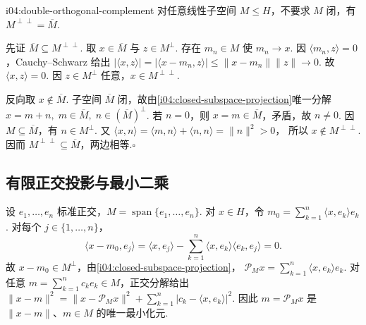 \begin{FAProposition}[B][双正交补定理]{i04:double-orthogonal-complement}
对任意线性子空间 \(\displaystyle M\leqslant H\)，不要求 \(\displaystyle M\) 闭，有 \(\displaystyle M^{\perp\perp}=\overline M\).
\end{FAProposition}

\begin{FAProof}
先证 \(\displaystyle \overline M\subseteq M^{\perp\perp}\). 取 \(\displaystyle x\in\overline M\) 与 \(\displaystyle z\in M^\perp\). 存在 \(\displaystyle m_n\in M\) 使 \(\displaystyle m_n\to x\). 因 \(\displaystyle \langle m_n,z\rangle=0\)，Cauchy--Schwarz 给出 \(\displaystyle |\langle x,z\rangle| =|\langle x-m_n,z\rangle| \leqslant\|x-m_n\|\|z\|\to0\).
故 \(\displaystyle \langle x,z\rangle=0\). 因 \(\displaystyle z\in M^\perp\) 任意，\(\displaystyle x\in M^{\perp\perp}\).

反向取 \(\displaystyle x\notin\overline M\). 子空间 \(\displaystyle \overline M\) 闭，故由\autoref{i04:closed-subspace-projection}唯一分解 \(\displaystyle x=m+n, \; m\in\overline M, \; n\in(\overline M)^\perp\).
若 \(\displaystyle n=0\)，则 \(\displaystyle x=m\in\overline M\)，矛盾，故 \(\displaystyle n\neq0\). 因 \(\displaystyle M\subseteq\overline M\)，有 \(\displaystyle n\in M^\perp\). 又 \(\displaystyle \langle x,n\rangle =\langle m,n\rangle+\langle n,n\rangle =\|n\|^2>0\)，
所以 \(\displaystyle x\notin M^{\perp\perp}\). 因而 \(\displaystyle M^{\perp\perp}\subseteq\overline M\)，两边相等.\hfill\(\square\)

\end{FAProof}

\subsection{有限正交投影与最小二乘}

\begin{FAApplication}[有限维正交最小二乘]
设 \(\displaystyle e_1,\dots,e_n\) 标准正交，\(\displaystyle M=\operatorname{span}\{e_1,\dots,e_n\}\). 对 \(\displaystyle x\in H\)，令 \(\displaystyle m_0=\sum_{k=1}^{n}\langle x,e_k\rangle e_k\).
对每个 \(\displaystyle j\in\{1,\dots,n\}\)，
\[
\langle x-m_0,e_j\rangle
=\langle x,e_j\rangle
-\sum_{k=1}^{n}\langle x,e_k\rangle\langle e_k,e_j\rangle
=0.
\]
故 \(\displaystyle x-m_0\in M^\perp\)，由\autoref{i04:closed-subspace-projection}， \(\displaystyle \mathcal P_Mx =\sum_{k=1}^{n}\langle x,e_k\rangle e_k\).
对任意 \(\displaystyle m=\sum_{k=1}^{n}c_ke_k\in M\)，正交分解给出 \(\displaystyle \|x-m\|^2 =\|x-\mathcal P_Mx\|^2 +\sum_{k=1}^{n}|c_k-\langle x,e_k\rangle|^2\).
因此 \(\displaystyle m=\mathcal P_Mx\) 是 \(\displaystyle \|x-m\|\)、\(\displaystyle m\in M\) 的唯一最小化元.
\end{FAApplication}

